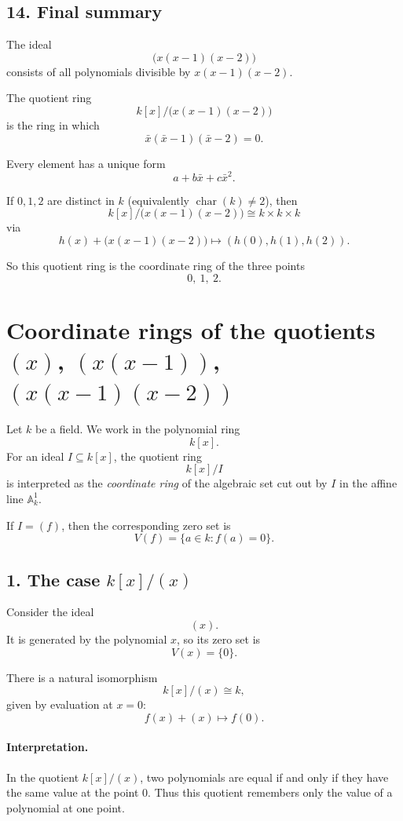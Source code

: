 \documentclass[12pt,a4paper]{article}
\theoremstyle{notespace}
\begin{document}
\subsection{14. Final summary}

The ideal
\[
\bigl(x(x-1)(x-2)\bigr)
\]
consists of all polynomials divisible by \(x(x-1)(x-2)\).

The quotient ring
\[
k[x]/\bigl(x(x-1)(x-2)\bigr)
\]
is the ring in which
\[
\bar x(\bar x-1)(\bar x-2)=0.
\]

Every element has a unique form
\[
a+b\bar x+c\bar x^2.
\]

If \(0,1,2\) are distinct in \(k\) (equivalently \(\operatorname{char}(k)\neq 2\)), then
\[
k[x]/\bigl(x(x-1)(x-2)\bigr)\cong k\times k\times k
\]
via
\[
h(x)+\bigl(x(x-1)(x-2)\bigr)\longmapsto (h(0),h(1),h(2)).
\]

So this quotient ring is the coordinate ring of the three points
\[
0,\ 1,\ 2.
\]	
	
	
\section{Coordinate rings of the quotients \((x)\), \((x(x-1))\), \((x(x-1)(x-2))\)}

Let \(k\) be a field. We work in the polynomial ring
\[
k[x].
\]
For an ideal \(I\subseteq k[x]\), the quotient ring
\[
k[x]/I
\]
is interpreted as the \emph{coordinate ring} of the algebraic set cut out by \(I\) in the affine line \(\mathbb A_k^1\).

If \(I=(f)\), then the corresponding zero set is
\[
V(f)=\{a\in k : f(a)=0\}.
\]

\subsection{1. The case \(k[x]/(x)\)}

Consider the ideal
\[
(x).
\]
It is generated by the polynomial \(x\), so its zero set is
\[
V(x)=\{0\}.
\]

There is a natural isomorphism
\[
k[x]/(x)\cong k,
\]
given by evaluation at \(x=0\):
\[
f(x)+(x)\longmapsto f(0).
\]

\paragraph{Interpretation.}
In the quotient \(k[x]/(x)\), two polynomials are equal if and only if they have the same value at the point \(0\). Thus this quotient remembers only the value of a polynomial at one point.
\end{document}
